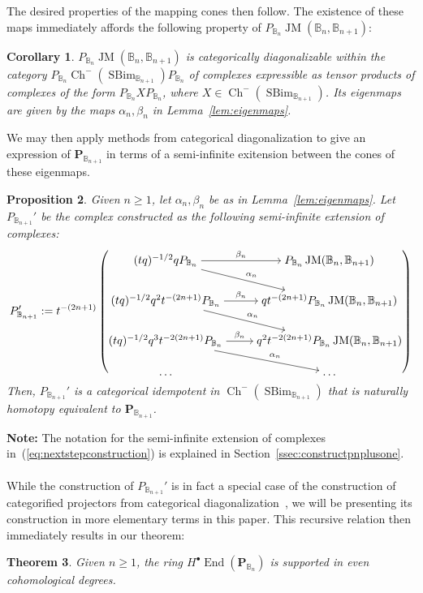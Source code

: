 \documentclass[11pt]{article}
\DeclareMathOperator{\End}{End}
\DeclareMathOperator{\Ch}{Ch}
\DeclareMathOperator{\SBim}{SBim}
\DeclareMathOperator{\JM}{JM}
\newtheorem{thm}{Theorem}[section]
\newtheorem{proposition}[thm]{Proposition}
\newtheorem{corollary}[thm]{Corollary}
\theoremstyle{definition}
\theoremstyle{remark}
\numberwithin{equation}{section}
\begin{document}
The desired properties of the mapping cones then follow.
The existence of these maps immediately affords the following property of
$P_{\mathbb{B}_n}\JM(\mathbb{B}_n,\mathbb{B}_{n+1})$:
\begin{corollary}
	$P_{\mathbb{B}_n}\JM(\mathbb{B}_n,\mathbb{B}_{n+1})$
	is categorically diagonalizable within
	the category $P_{\mathbb{B}_n}\Ch^-(\SBim_{\mathbb{B}_{n+1}})
	P_{\mathbb{B}_n}$ of complexes
	expressible as tensor products of complexes of the form
	$P_{\mathbb{B}_n}XP_{\mathbb{B}_n}$, where
	$X\in\Ch^-(\SBim_{\mathbb{B}_{n+1}})$. Its eigenmaps
	are given by the maps $\alpha_n,\beta_n$ in
	Lemma~\ref{lem:eigenmaps}.
\end{corollary}
\noindent We may then apply methods from categorical diagonalization to
give an expression of $\mathbf{P}_{\mathbb{B}_{n+1}}$ in terms of a
semi-infinite exitension between the cones of
these eigenmaps.
\begin{proposition}
	\label{prop:symexistence}
	Given $n\geq 1$, let $\alpha_n,\beta_n$ be as in
	Lemma~\ref{lem:eigenmaps}.
	Let $P_{\mathbb{B}_{n+1}}'$
	be the complex constructed as the following semi-infinite
	extension of complexes:
\begin{equation}\label{eq:nextstepconstruction}
	P_{\mathbb{B}_{n+1}}':=	t^{-(2n+1)}\left(
\begin{tikzcd}[ampersand replacement=\&,cramped]
	{(tq)^{-1/2}qP_{\mathbb{B}_n}} \& {P_{\mathbb{B}_n}\JM(\mathbb{B}_n,\mathbb{B}_{n+1})} \\
	{(tq)^{-1/2}q^2t^{-(2n+1)}P_{\mathbb{B}_n}} \& {qt^{-(2n+1)}P_{\mathbb{B}_n}\JM(\mathbb{B}_n,\mathbb{B}_{n+1})} \\
	{(tq)^{-1/2}
	q^3t^{-2(2n+1)}P_{\mathbb{B}_n}} \& {q^2t^{-2(2n+1)}P_{\mathbb{B}_n}\JM(\mathbb{B}_n,\mathbb{B}_{n+1})} \\
	\dots \& \dots
	\arrow["{\beta_n}", from=1-1, to=1-2]
	\arrow["{\alpha_n}", from=1-1, to=2-2]
	\arrow["{\beta_n}", from=2-1, to=2-2]
	\arrow["{\alpha_n}", from=2-1, to=3-2]
	\arrow["{\beta_n}", from=3-1, to=3-2]
	\arrow["{\alpha_n}", from=3-1, to=4-2]
\end{tikzcd}\right)
\end{equation}
Then, $P_{\mathbb{B}_{n+1}}'$ is a categorical idempotent
in $\Ch^-(\SBim_{\mathbb{B}_{n+1}})$ that is naturally homotopy equivalent to
$\mathbf{P}_{\mathbb{B}_{n+1}}$.
\end{proposition}
\noindent \textbf{Note:} The notation for the semi-infinite extension of
complexes in~(\ref{eq:nextstepconstruction}) is
explained in Section~\ref{ssec:constructpnplusone}.
\\ \\
While the construction of $P_{\mathbb{B}_{n+1}}'$ is in fact a special case of the
construction of categorified
projectors from categorical
diagonalization~\cite{elias_categorical_2017},
we will be presenting its construction in more elementary terms in this paper.
This recursive relation then immediately results in our theorem:
\begin{thm}
	\label{thm:homspaceparity}
	Given $n\geq 1$, the ring $H^\bullet\End(\mathbf{P}_{\mathbb{B}_n})$
	is supported
	in even cohomological degrees.
\end{thm}
\end{document}
